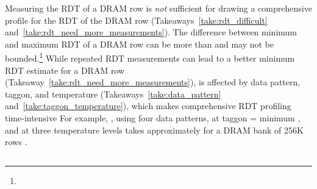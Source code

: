 Measuring the RDT of a DRAM row  is
\emph{not} sufficient for drawing a comprehensive profile for the RDT of the
DRAM row (Takeaways~\ref{take:rdt_difficult}
and~\ref{take:rdt_need_more_measurements}). The difference between 
minimum and maximum RDT of a DRAM row can be more than
 and may not be bounded.\footnote{} While repeated RDT measurements can lead to a better
minimum RDT estimate for a DRAM row
(Takeaway~\ref{take:rdt_need_more_measurements}), \phenomenon{} is affected by
data pattern, \gls{taggon}, and temperature (Takeaways~\ref{take:data_pattern}
and~\ref{take:taggon_temperature}), which makes comprehensive RDT profiling
time-intensive  For example, , using four
data patterns, at \gls{taggon} = minimum , and at three
temperature levels takes approximately  for a
 DRAM bank of 256K rows .


\subsection{}

